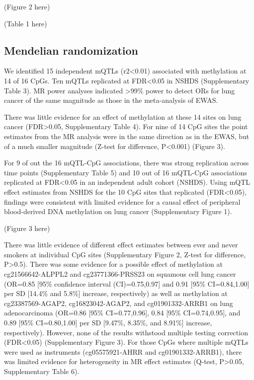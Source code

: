 \documentclass[11pt,twoside]{bristolthesis}
\begin{document}
(Figure 2 here)

(Table 1 here)

\hypertarget{mendelian-randomization-2}{%
\subsection{Mendelian randomization}\label{mendelian-randomization-2}}

We identified 15 independent mQTLs (r2\textless0.01) associated with methylation at 14 of 16 CpGs. Ten mQTLs replicated at FDR\textless0.05 in NSHDS (Supplementary Table 3). MR power analyses indicated \textgreater99\% power to detect ORs for lung cancer of the same magnitude as those in the meta-analysis of EWAS.

There was little evidence for an effect of methylation at these 14 sites on lung cancer (FDR\textgreater0.05, Supplementary Table 4). For nine of 14 CpG sites the point estimates from the MR analysis were in the same direction as in the EWAS, but of a much smaller magnitude (Z-test for difference, P\textless0.001) (Figure 3).

For 9 of out the 16 mQTL-CpG associations, there was strong replication across time points (Supplementary Table 5) and 10 out of 16 mQTL-CpG associations replicated at FDR\textless0.05 in an independent adult cohort (NSHDS). Using mQTL effect estimates from NSHDS for the 10 CpG sites that replicated (FDR\textless0.05), findings were consistent with limited evidence for a causal effect of peripheral blood-derived DNA methylation on lung cancer (Supplementary Figure 1).

(Figure 3 here)

There was little evidence of different effect estimates between ever and never smokers at individual CpG sites (Supplementary Figure 2, Z-test for difference, P\textgreater0.5). There was some evidence for a possible effect of methylation at cg21566642-ALPPL2 and cg23771366-PRSS23 on squamous cell lung cancer (OR=0.85 {[}95\% confidence interval (CI)=0.75,0.97{]} and 0.91 {[}95\% CI=0.84,1.00{]} per SD {[}14.4\% and 5.8\%{]} increase, respectively) as well as methylation at cg23387569-AGAP2, cg16823042-AGAP2, and cg01901332-ARRB1 on lung adenocarcinoma (OR=0.86 {[}95\% CI=0.77,0.96{]}, 0.84 {[}95\% CI=0.74,0.95{]}, and 0.89 {[}95\% CI=0.80,1.00{]} per SD {[}9.47\%, 8.35\%, and 8.91\%{]} increase, respectively). However, none of the results withstood multiple testing correction (FDR\textless0.05) (Supplementary Figure 3). For those CpGs where multiple mQTLs were used as instruments (cg05575921-AHRR and cg01901332-ARRB1), there was limited evidence for heterogeneity in MR effect estimates (Q-test, P\textgreater0.05, Supplementary Table 6).
\end{document}
